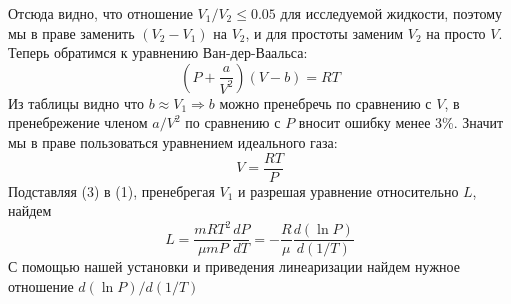 \documentclass[12 pt, a4paper]{article}%
\begin{document}
Отсюда видно, что отношение $V_1/V_2 \leq 0.05$ для исследуемой жидкости, поэтому мы в праве заменить $(V_2 - V_1)$ на $V_2$, и для простоты заменим $V_2$ на просто $V$. \newpage
Теперь обратимся к уравнению Ван-дер-Ваальса: 
\begin{equation}
    (P+\frac{a}{V^2})(V-b) = RT
\end{equation}
Из таблицы видно что $b \approx V_1 \Rightarrow b$ можно пренебречь по сравнению с $V$, в пренебрежение членом $a/V^2$ по сравнению с $P$ вносит ошибку менее 3\%. Значит мы в праве пользоваться уравнением идеального газа:
\begin{equation}
    V = \frac{RT}{P}
\end{equation}
Подставляя (3) в (1), пренебрегая $V_1$ и разрешая уравнение относительно $L$, найдем
\begin{equation}
    L = \frac{mRT^2}{\mu mP} \frac{dP}{dT} = - \frac{R}{\mu} \frac{d(\ln{P})}{d(1/T)}
\end{equation}
С помощью нашей установки и приведения линеаризации найдем нужное отношение $d(\ln{P})/d(1/T)$ \\
\end{document}

